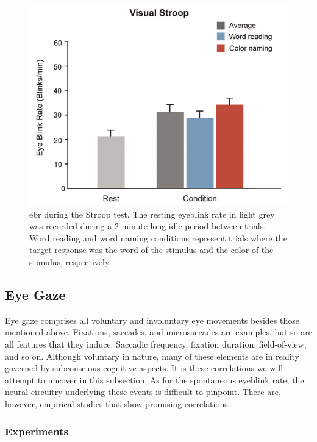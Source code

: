\begin{figure}[h]
    \centering
    \includegraphics[width=\textwidth]{figures/bt_oh2012B.png}
    \caption{\acrfull{ebr} during the Stroop test. The resting eyeblink rate in light grey was recorded during a 2 minute long idle period between trials. Word reading and word naming conditions represent trials where the target response was the word of the stimulus and the color of the stimulus, respectively.}
    \label{fig:bt/oh2012B}
\end{figure}

\subsection{Eye Gaze} \label{sec:bt/cognitive_impacts/gaze}

Eye gaze comprises all voluntary and involuntary eye movements besides those mentioned above. Fixations, saccades, and microsaccades are examples, but so are all features that they induce: Saccadic frequency, fixation duration, field-of-view, and so on. Although voluntary in nature, many of these elements are in reality governed by subconscious cognitive aspects. It is these correlations we will attempt to uncover in this subsection. As for the spontaneous eyeblink rate, the neural circuitry underlying these events is difficult to pinpoint. There are, however, empirical studies that show promising correlations.

\subsubsection{Experiments}

